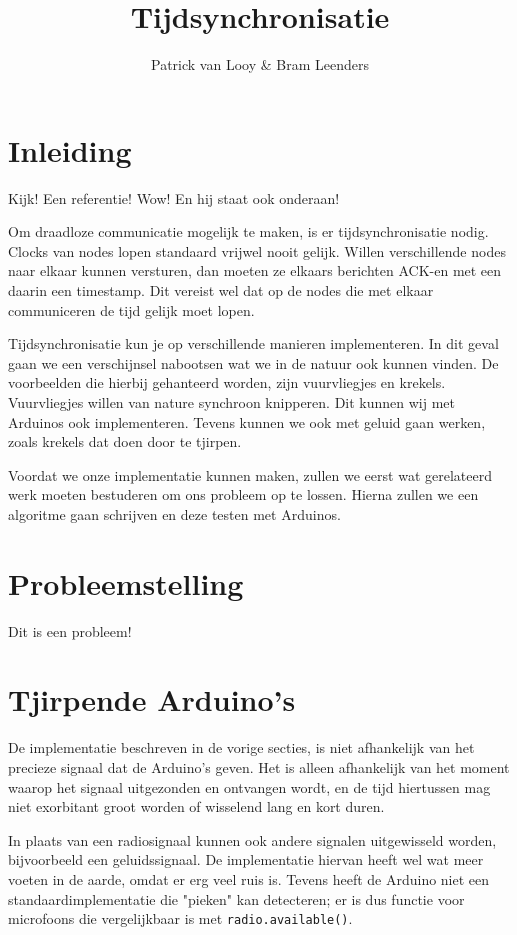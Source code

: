 \documentclass[a4paper,10pt]{article}
\title{Tijdsynchronisatie}
\author{Patrick van Looy \& Bram Leenders}
\begin{document}
\maketitle

\section{Inleiding}
Kijk! Een referentie! \cite{sundararaman2005clock} Wow! En hij staat ook onderaan!

Om draadloze communicatie mogelijk te maken, is er tijdsynchronisatie nodig. Clocks van nodes lopen standaard vrijwel nooit gelijk. Willen verschillende nodes naar elkaar kunnen versturen, dan moeten ze elkaars berichten ACK-en met een daarin een timestamp. Dit vereist wel dat op de nodes die met elkaar communiceren de tijd gelijk moet lopen.

Tijdsynchronisatie kun je op verschillende manieren implementeren. In dit geval gaan we een verschijnsel nabootsen wat we in de natuur ook kunnen vinden. De voorbeelden die hierbij gehanteerd worden, zijn vuurvliegjes en krekels. Vuurvliegjes willen van nature synchroon knipperen. Dit kunnen wij met Arduinos ook implementeren. Tevens kunnen we ook met geluid gaan werken, zoals krekels dat doen door te tjirpen.

Voordat we onze implementatie kunnen maken, zullen we eerst wat gerelateerd werk moeten bestuderen om ons probleem op te lossen. Hierna zullen we een algoritme gaan schrijven en deze testen met Arduinos.

\section{Probleemstelling}
Dit is een probleem!


\section{Tjirpende Arduino's}
De implementatie beschreven in de vorige secties, is niet afhankelijk van het precieze signaal dat de Arduino's geven. Het is alleen afhankelijk van het moment waarop het signaal uitgezonden en ontvangen wordt, en de tijd hiertussen mag niet exorbitant groot worden of wisselend lang en kort duren.

In plaats van een radiosignaal kunnen ook andere signalen uitgewisseld worden, bijvoorbeeld een geluidssignaal. De implementatie hiervan heeft wel wat meer voeten in de aarde, omdat er erg veel ruis is. Tevens heeft de Arduino niet een standaardimplementatie die "pieken" kan detecteren; er is dus functie voor microfoons die vergelijkbaar is met \texttt{radio.available()}.
\end{document}
